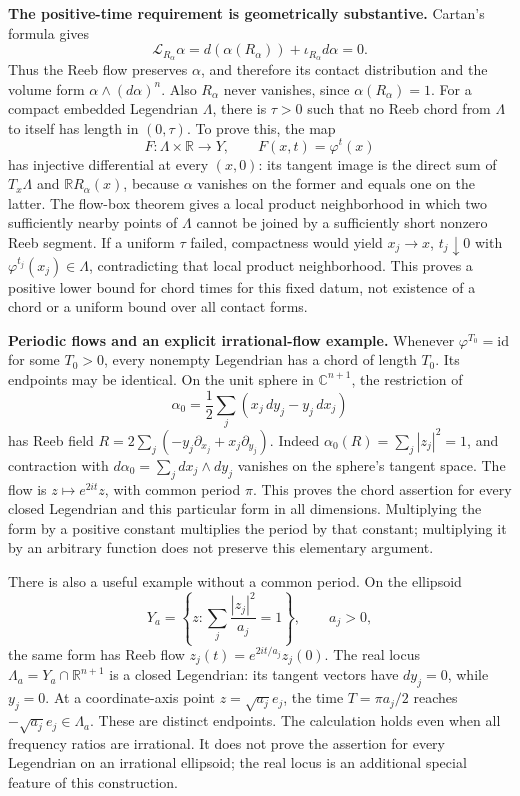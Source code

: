 \documentclass[11pt]{article}
\begin{document}
\textbf{The positive-time requirement is geometrically substantive.}
Cartan's formula gives
\[
 \mathcal L_{R_\alpha}\alpha
 =d(\alpha(R_\alpha))+\iota_{R_\alpha}d\alpha=0.
\]
Thus the Reeb flow preserves $\alpha$, and therefore its contact distribution
and the volume form $\alpha\wedge(d\alpha)^n$.  Also $R_\alpha$ never vanishes,
since $\alpha(R_\alpha)=1$.  For a compact embedded Legendrian $\Lambda$, there
is $\tau>0$ such that no Reeb chord from $\Lambda$ to itself has length in
$(0,\tau)$.  To prove this, the map
\[
 F:\Lambda\times\mathbb R\longrightarrow Y,\qquad F(x,t)=\varphi^t(x)
\]
has injective differential at every $(x,0)$: its tangent image is the direct
sum of $T_x\Lambda$ and $\mathbb R R_\alpha(x)$, because $\alpha$ vanishes on
the former and equals one on the latter.  The flow-box theorem gives a local
product neighborhood in which two sufficiently nearby points of $\Lambda$
cannot be joined by a sufficiently short nonzero Reeb segment.  If a uniform
$\tau$ failed, compactness would yield $x_j\to x$, $t_j\downarrow0$ with
$\varphi^{t_j}(x_j)\in\Lambda$, contradicting that local product neighborhood.
This proves a positive lower bound for chord times for this fixed datum, not
existence of a chord or a uniform bound over all contact forms.

\textbf{Periodic flows and an explicit irrational-flow example.}
Whenever $\varphi^{T_0}=\mathrm{id}$ for some $T_0>0$, every nonempty
Legendrian has a chord of length $T_0$.  Its endpoints may be identical.
On the unit sphere in $\mathbb C^{n+1}$, the restriction of
\[
 \alpha_0=\frac12\sum_j(x_j\,dy_j-y_j\,dx_j)
\]
has Reeb field $R=2\sum_j(-y_j\partial_{x_j}+x_j\partial_{y_j})$.
Indeed $\alpha_0(R)=\sum_j|z_j|^2=1$, and contraction with
$d\alpha_0=\sum_j dx_j\wedge dy_j$ vanishes on the sphere's tangent space.
The flow is $z\mapsto e^{2it}z$, with common period $\pi$.  This proves the
chord assertion for every closed Legendrian and this particular form in all
dimensions.  Multiplying the form by a positive constant multiplies the
period by that constant; multiplying it by an arbitrary function does not
preserve this elementary argument.

There is also a useful example without a common period.  On the ellipsoid
\[
 Y_a=\left\{z:\sum_j\frac{|z_j|^2}{a_j}=1\right\},\qquad a_j>0,
\]
the same form has Reeb flow $z_j(t)=e^{2it/a_j}z_j(0)$.
The real locus $\Lambda_a=Y_a\cap\mathbb R^{n+1}$ is a closed Legendrian:
its tangent vectors have $dy_j=0$, while $y_j=0$.  At a coordinate-axis point
$z=\sqrt{a_j}e_j$, the time $T=\pi a_j/2$ reaches
$-\sqrt{a_j}e_j\in\Lambda_a$.  These are distinct endpoints.
The calculation holds even when all frequency ratios are irrational.  It
does not prove the assertion for every Legendrian on an irrational ellipsoid;
the real locus is an additional special feature of this construction.
\end{document}
